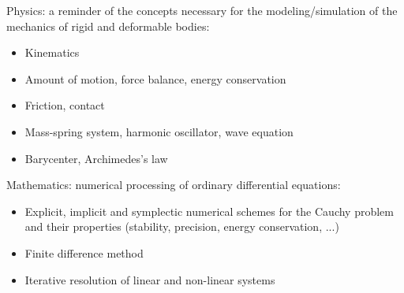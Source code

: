Physics: a reminder of the concepts necessary for the modeling/simulation of the mechanics of rigid and deformable bodies:
\begin{itemize}
    \item Kinematics
    \item Amount of motion, force balance, energy conservation
    \item Friction, contact
    \item Mass-spring system, harmonic oscillator, wave equation
    \item Barycenter, Archimedes's law
\end{itemize}
Mathematics: numerical processing of ordinary differential equations:
\begin{itemize}
    \item Explicit, implicit and symplectic numerical schemes for the Cauchy problem and their properties (stability, precision, energy conservation, ...)
    \item Finite difference method
    \item Iterative resolution of linear and non-linear systems
\end{itemize}